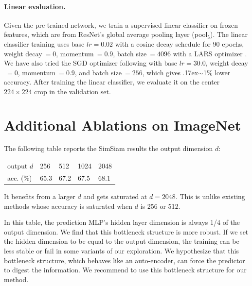 \documentclass[final]{cvpr}
\newcommand{\app}{\raise.17ex\hbox{$\scriptstyle\sim$}}
\newcommand{\tablestyle}[2]{\setlength{\tabcolsep}{#1}\renewcommand{\arraystretch}{#2}\centering\footnotesize}
\begin{document}
\paragraph{Linear evaluation.} Given the pre-trained network, we train a supervised linear classifier on frozen features, which are from ResNet's global average pooling layer (pool$_5$). 
The linear classifier training uses base $lr\!=\!0.02$ with a cosine decay schedule for 90 epochs, weight decay$~\!=\!0$, momentum$~\!=\!0.9$, batch size$~\!=\!4096$ with a LARS optimizer \cite{You2017}. We have also tried the SGD optimizer following \cite{He2019a} with base $lr\!=\!30.0$, weight decay$~\!=\!0$, momentum$~\!=\!0.9$, and batch size$~\!=\!256$, which gives \app1\% lower accuracy.
After training the linear classifier, we evaluate it on the center $224{\times}224$ crop in the validation set.

\section{Additional Ablations on ImageNet} \label{subsec:sensitivity}

The following table reports the SimSiam results \vs the output dimension $d$:
\begin{center}
\vspace{-.2em}
\small
\tablestyle{1pt}{1.1}
\begin{tabular}{x{48} | x{28}x{28}x{28}x{28}}
output $d$ & 256 & 512 & 1024 & 2048 \\
\shline
acc. (\%) & 65.3 & 67.2 & 67.5 & 68.1 \\
\end{tabular}
\vspace{-.2em}
\end{center}
It benefits from a larger $d$ and gets saturated at $d\!=\!\text{2048}$. This is unlike existing methods \cite{Wu2018a,He2019a,Chen2020,Grill2020} whose accuracy is saturated when $d$ is 256 or 512. 

In this table, the prediction MLP's hidden layer dimension is always 1/4 of the output dimension. We find that this bottleneck structure is more robust. If we set the hidden dimension to be equal to the output dimension, the training can be less stable or fail in some variants of our exploration.
We hypothesize that this bottleneck structure, which behaves like an auto-encoder, can force the predictor to digest the information.
We recommend to use this bottleneck structure for our method.
\end{document}
